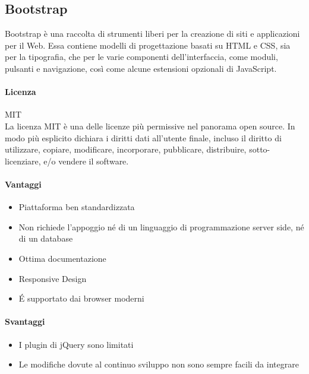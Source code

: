 \subsection{Bootstrap}

Bootstrap è una raccolta di strumenti liberi per la creazione di siti
e applicazioni per il Web. Essa contiene modelli di progettazione
basati su HTML e CSS, sia per la tipografia, che per le varie
componenti dell'interfaccia, come moduli, pulsanti e navigazione, così
come alcune estensioni opzionali di JavaScript. \\

\paragraph{Licenza} MIT \\
La licenza MIT è una delle licenze più permissive nel panorama open
source. In modo più esplicito dichiara i diritti dati all'utente
finale, incluso il diritto di utilizzare, copiare, modificare,
incorporare, pubblicare, distribuire, sotto-licenziare, e/o vendere il
software. 

\paragraph{Vantaggi}
\begin{itemize}
	
	\item Piattaforma ben standardizzata 
	\item Non richiede l’appoggio né di un linguaggio di programmazione server side, né di un database
	\item Ottima documentazione
	\item Responsive Design	
	\item \'E supportato dai browser moderni
	
\end{itemize}

\paragraph{Svantaggi} 
\begin{itemize}
	\item I plugin di jQuery sono limitati
	\item Le modifiche dovute al continuo sviluppo non sono sempre facili da integrare
\end{itemize}



